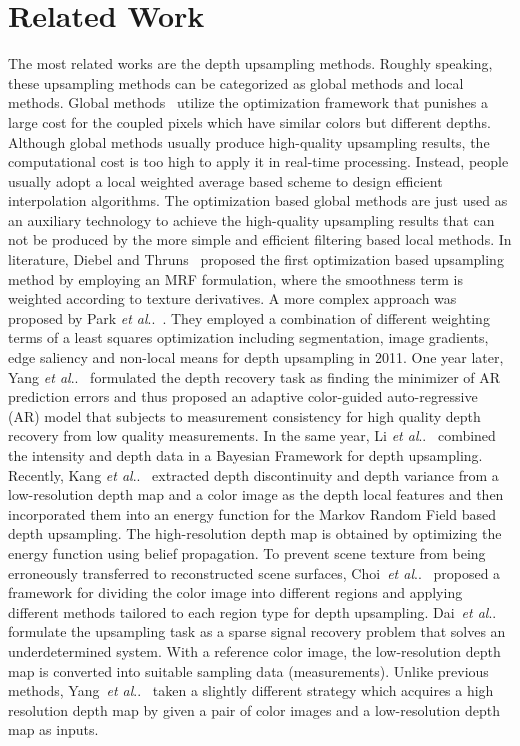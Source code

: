 \documentclass[preprint,10pt,5p,times,twocolumn]{elsarticle}
\makeatletter
\DeclareRobustCommand\onedot{\futurelet\@let@token\@onedot}
\def\@onedot{\ifx\@let@token.\else.\null\fi\xspace}
\def\etal{\emph{et al}\onedot}
\makeatother
\begin{document}

\section{Related Work}
%

The most related works are the depth upsampling methods. Roughly speaking, these upsampling methods can be categorized as global methods and local methods. Global methods~\cite{Diebel2005,Park2011,YangJingyu2012} utilize the optimization framework that punishes a large cost for the coupled pixels which have similar colors but different depths. Although global methods usually produce high-quality upsampling results, the computational cost is too high to apply it in real-time processing. Instead, people usually adopt a local weighted average based scheme to design efficient interpolation algorithms. The optimization based global methods are just used as an auxiliary technology to achieve the high-quality upsampling results that can not be produced by the more simple and efficient  filtering based local methods. In literature, Diebel and Thruns~\cite{Diebel2005} proposed the first optimization based upsampling method by employing an MRF formulation, where the smoothness term is weighted according to texture derivatives. A more complex approach was proposed by Park \etal~\cite{Park2011}. They employed a combination of different weighting terms of a least squares optimization including segmentation, image gradients, edge saliency and non-local means for depth upsampling in 2011. One year later, Yang \etal~\cite{YangJingyu2012} formulated the depth recovery task as finding the  minimizer of AR prediction errors and thus proposed an adaptive color-guided auto-regressive (AR) model that  subjects to measurement consistency  for high quality depth recovery from low quality measurements. In the same year, Li \etal~\cite{Li_ACCV_2012} combined the intensity and depth data in a Bayesian Framework for depth upsampling. Recently, Kang \etal~\cite{Kang_ET_2014} extracted depth discontinuity and depth variance from a low-resolution depth map and a color image as the depth local features and then incorporated them into an energy function for the Markov Random Field based depth upsampling. The high-resolution depth map is obtained by optimizing the energy function using belief propagation. To prevent scene texture from being erroneously transferred to reconstructed scene surfaces, Choi~\etal~\cite{Choi_TIP_2014} proposed a framework for dividing the color image into different regions and applying different methods tailored to each region type for depth upsampling. Dai~\etal~\cite{Dai_Neurocomputing_2015} formulate the upsampling task as a sparse signal recovery problem that solves an underdetermined system. With a reference color image, the low-resolution depth map is converted into suitable sampling data (measurements). Unlike previous methods, Yang~\etal~\cite{Yang_NC_2015} taken a slightly different strategy which acquires a high resolution depth map by given a pair of color images and a low-resolution depth map as inputs.
\end{document}
